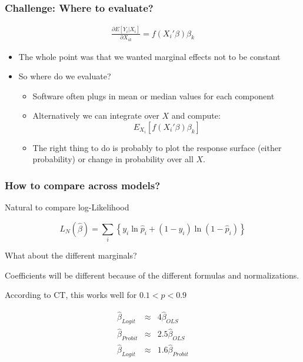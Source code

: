 \documentclass[11pt,dvipsnames,table,aspectratio=169]{beamer}
\begin{document}
\begin{frame}
       \frametitle{Challenge: Where to evaluate?}
       \begin{eqnarray*}
       \frac{\partial E[Y_i | X_i] }{\partial X_{ik}} = f (X_i'\beta) \beta_k
       \end{eqnarray*}
       \begin{itemize}
       \item The whole point was that we wanted marginal effects not to be constant
       \item So where do we evaluate?
       \begin{itemize}
       \item Software often plugs in mean or median values for each component
       \item Alternatively we can integrate over $X$ and compute:
       $$
       E_{X_i}[ f (X_i'\beta) \beta_k]
       $$
       \item The right thing to do is probably to plot the response surface (either probability) or change in probability over all $X$.
       \end{itemize}
       \end{itemize}
\end{frame}

\begin{frame}
       \frametitle{How to compare across models?}

       Natural to compare log-Likelihood

       $$ L_N(\hat \beta) = \sum_i \left\{ y_i \ln \hat p_i + (1- y_i) \ln (1 - \hat p_i) \right\} $$

       \pause 
       What about the different marginals?
       
       \medskip
       Coefficients will be different because of the different formulas and normalizations. 
       
       \medskip
       According to CT, this works well for $0.1 < p < 0.9$

       \begin{eqnarray*}
              \hat \beta_{Logit} &\approx& 4 \hat \beta_{OLS} \\
              \hat \beta_{Probit} &\approx& 2.5 \hat \beta_{OLS} \\
              \hat \beta_{Logit} &\approx& 1.6 \hat \beta_{Probit}
       \end{eqnarray*}
\end{frame}
\end{document}

